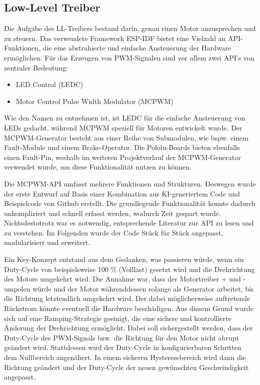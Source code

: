 \subsection{Low-Level Treiber}

Die Aufgabe des LL-Treibers bestand darin, genau einen Motor anzusprechen und zu steuern. Das verwendete Framework ESP-IDF bietet eine Vielzahl an API-Funktionen, die eine abstrahierte und einfache Ansteuerung der Hardware ermöglichen. Für das Erzeugen von PWM-Signalen sind vor allem zwei API's von zentraler Bedeutung:

\begin{itemize}
    \item LED Control (LEDC)
    \item Motor Control Pulse Width Modulator (MCPWM)
\end{itemize}

Wie den Namen zu entnehmen ist, ist LEDC für die einfache Ansteuerung von LEDs gedacht, während MCPWM speziell für Motoren entwickelt wurde. Der MCPWM-Generator besteht aus einer Reihe von Submodulen, wie bspw. einem Fault-Module und einem Brake-Operator. Die Pololu-Boards bieten ebenfalls einen Fault-Pin, weshalb im weiteren Projektverlauf der MCPWM-Generator verwendet wurde, um diese Funktionalität nutzen zu können. \newline

Die MCPWM-API umfasst mehrere Funktionen und Strukturen. Deswegen wurde der erste Entwurf auf Basis einer Kombination aus KI-generiertem Code und Beispielcode von Github erstellt. Die grundlegende Funktionalität konnte dadurch unkompliziert und schnell erfasst werden, wodurch Zeit gespart wurde. Nichtsdestotrotz war es notwendig, entsprechende Literatur zur API zu lesen und zu verstehen. Im Folgenden wurde der Code Stück für Stück angepasst, modularisiert und erweitert. \newline

Ein Key-Konzept entstand aus dem Gedanken, was passieren würde, wenn ein Duty-Cycle von beispielsweise 100 \% (Volllast) gesetzt wird und die Drehrichtung des Motors umgekehrt wird. Die Annahme war, dass der Motortreiber + und - umpolen würde und der Motor währenddessen solange als Generator arbeitet, bis die Richtung letztendlich umgekehrt wird. Der dabei möglicherweise auftretende Rückstrom könnte eventuell die Hardware beschädigen. Aus diesem Grund wurde sich auf eine Ramping-Strategie geeinigt, die eine sichere und kontrollierte Änderung der Drehrichtung ermöglicht. Dabei soll sichergestellt werden, dass der Duty-Cycle des PWM-Signals bzw. die Richtung für den Motor nicht abrupt geändert wird. Stattdessen wird der Duty-Cycle in konfigurierbaren Schritten dem Nullbereich angenähert. In einem sicheren Hysteresebereich wird dann die Richtung geändert und der Duty-Cycle der neuen gewünschten Geschwindigkeit angepasst. \newline

